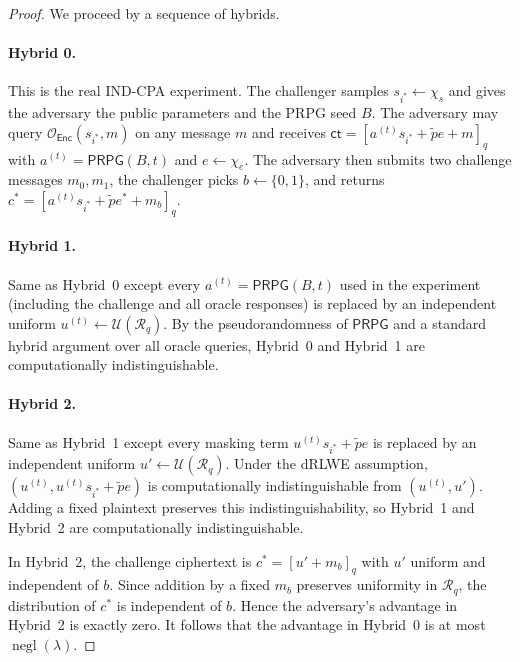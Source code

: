 \documentclass[a4paper,11pt]{article}
\DeclareMathOperator{\negl}{negl}
\begin{document}
\begin{proof}
We proceed by a sequence of hybrids.

\paragraph{Hybrid 0.} This is the real IND-CPA experiment. The challenger samples $s_{i^*} \leftarrow \chi_s$ and gives the adversary the public parameters and the PRPG seed $B$. The adversary may query $\mathcal{O}_{\mathsf{Enc}}(s_{i^*}, m)$ on any message $m$ and receives $\mathsf{ct} = [a^{(t)} s_{i^*} + \tilde{p} e + m]_q$ with $a^{(t)} = \mathsf{PRPG}(B,t)$ and $e \leftarrow \chi_e$. The adversary then submits two challenge messages $m_0, m_1$, the challenger picks $b \leftarrow \{0,1\}$, and returns $c^* = [a^{(t)} s_{i^*} + \tilde{p} e^* + m_b]_q$.

\paragraph{Hybrid 1.} Same as Hybrid~0 except every $a^{(t)} = \mathsf{PRPG}(B,t)$ used in the experiment (including the challenge and all oracle responses) is replaced by an independent uniform $u^{(t)} \leftarrow \mathcal{U}(\mathcal{R}_q)$. By the pseudorandomness of $\mathsf{PRPG}$ and a standard hybrid argument over all oracle queries, Hybrid~0 and Hybrid~1 are computationally indistinguishable.

\paragraph{Hybrid 2.} Same as Hybrid~1 except every masking term $u^{(t)} s_{i^*} + \tilde{p} e$ is replaced by an independent uniform $u' \leftarrow \mathcal{U}(\mathcal{R}_q)$. Under the dRLWE assumption, $(u^{(t)}, u^{(t)} s_{i^*} + \tilde{p} e)$ is computationally indistinguishable from $(u^{(t)}, u')$. Adding a fixed plaintext preserves this indistinguishability, so Hybrid~1 and Hybrid~2 are computationally indistinguishable.

In Hybrid~2, the challenge ciphertext is $c^* = [u' + m_b]_q$ with $u'$ uniform and independent of $b$. Since addition by a fixed $m_b$ preserves uniformity in $\mathcal{R}_q$, the distribution of $c^*$ is independent of $b$. Hence the adversary's advantage in Hybrid~2 is exactly zero. It follows that the advantage in Hybrid~0 is at most $\negl(\lambda)$.
\end{proof}

\end{document}

